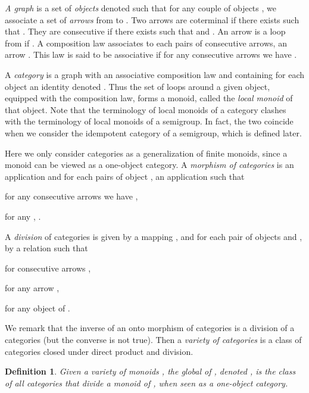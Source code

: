 \documentclass[submission,hidelink]{dmtcs-episciences}
\newtheorem{definition}[theorem]{Definition}
\newenvironment{conditions}
{\begin{list}{\rm (\theenumi)}{\noindent \usecounter{enumi}\setlength{\topsep}{2pt}\setlength{\partopsep}{0pt}\setlength{\itemsep}{2pt}\setlength{\parsep}{0pt}\setlength{\leftmargin}{2.5em}\setlength{\labelwidth}{1.5em}\setlength{\labelsep}{0.5em}\setlength{\listparindent}{0pt}\setlength{\itemindent}{0pt}}}{\end{list}}
\begin{document}
		\emph{A graph } is a set of \emph{objects} denoted 
		such that for any couple of objects , we associate a set  of \emph{arrows} from  to .
		Two arrows	 are coterminal if there exists  such that . They are consecutive if there exists
		 such that  and .  An arrow  is a loop from
		 if . A  composition law associates to each pairs of consecutive arrows,  an arrow .
		This law is said to be associative if for any consecutive arrows  we have .

		A \emph{category}  is a graph
		with an associative composition law and containing
		for each object  an identity denoted .
		Thus the set of loops around a given object, equipped with the composition law, forms a monoid,
		called the \emph{local monoid} of that object.
		Note that the terminology of local monoids of a category clashes with the terminology of local monoids of a semigroup.
		In fact, the two coincide when we consider the idempotent category of a semigroup, which is defined later.

		Here we only consider categories as
		a generalization of finite monoids, since a monoid can be viewed as a
		one-object category.
		A \emph{morphism of categories}  is an application
		 and for each pairs
		of object , an application  such that
		\begin{conditions}
			\item for any consecutive arrows  we have ,
			\item for any , .
		\end{conditions}

		A \emph{division} of categories 
		is given by a mapping ,
		and for each pair of objects  and , by a relation 
		such that
			\begin{conditions}
			\item  for consecutive arrows ,
			\item  for any arrow ,
			\item  for any object  of .
			\end{conditions}
	We remark that the inverse of an onto morphism of categories is a division of a categories (but the converse is not
	true).
	Then a \emph{variety of categories} is a class of categories closed under direct product and division.

	\begin{definition}
		Given a variety of monoids , the \emph{global} of , denoted , is the class of all categories that divide a monoid of , when seen as a one-object category.
\end{definition}
\end{document}
